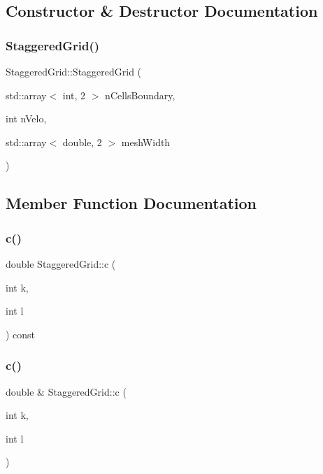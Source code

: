 \subsection{Constructor \& Destructor Documentation}
\mbox{\label{classStaggeredGrid_a12ac13158f4c9c267ca00c8f4af5e359}} 
\subsubsection{\texorpdfstring{StaggeredGrid()}{StaggeredGrid()}}
{\footnotesize\ttfamily Staggered\+Grid\+::\+Staggered\+Grid (\begin{DoxyParamCaption}\item[{std\+::array$<$ int, 2 $>$}]{n\+Cells\+Boundary,  }\item[{int}]{n\+Velo,  }\item[{std\+::array$<$ double, 2 $>$}]{mesh\+Width }\end{DoxyParamCaption})}



\subsection{Member Function Documentation}
\mbox{\label{classStaggeredGrid_af1e5cee09668b3d2c693989f42ca3c8d}} 
\subsubsection{\texorpdfstring{c()}{c()}\hspace{0.1cm}{\footnotesize\ttfamily [1/2]}}
{\footnotesize\ttfamily double Staggered\+Grid\+::c (\begin{DoxyParamCaption}\item[{int}]{k,  }\item[{int}]{l }\end{DoxyParamCaption}) const}

\mbox{\label{classStaggeredGrid_a73f563888c48febcbe71bcaaed297b49}} 
\subsubsection{\texorpdfstring{c()}{c()}\hspace{0.1cm}{\footnotesize\ttfamily [2/2]}}
{\footnotesize\ttfamily double \& Staggered\+Grid\+::c (\begin{DoxyParamCaption}\item[{int}]{k,  }\item[{int}]{l }\end{DoxyParamCaption})}

